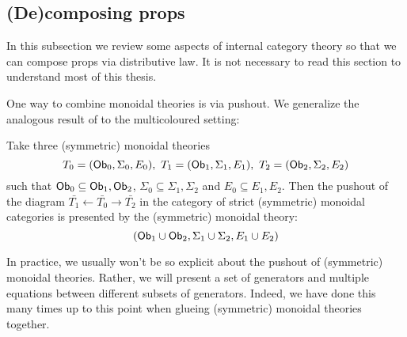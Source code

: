 

\subsection{(De)composing props}
\label{subsec:internal}
%
%
%
%
%
%
%



In this subsection we review some aspects of internal category theory so that we can compose props via distributive law.  It is not necessary to read this section to understand most of this thesis.






One way to combine monoidal theories is via pushout.  We generalize the analogous result of \cite[Proposition 2.51]{ih} to the multicoloured setting:
\begin{lemma}
Take three (symmetric) monoidal theories
$$T_0=({\sf Ob}_0,\Sigma_0 ,E_0 ), \ T_1=({\sf Ob}_1,\Sigma_1 ,E_1 ), \ T_2=({\sf Ob}_2,\Sigma_2 ,E_2 )$$
such that ${\sf Ob}_0 \subseteq {\sf Ob}_1,{\sf Ob}_2$, $\Sigma_0 \subseteq \Sigma_1,\Sigma_2$ and $E_0 \subseteq E_1,E_2$.
Then the pushout of the diagram $\bar{T_1} \leftarrow \bar{T_0} \rightarrow \bar{T_2}$  in the category of strict (symmetric) monoidal categories is presented by the (symmetric) monoidal theory:
$$
( {\sf Ob}_1 \cup {\sf Ob}_2, \Sigma_1 \cup \Sigma_2, E_1 \cup E_2)
$$
\end{lemma}
In practice, we usually won't be so explicit about the pushout of (symmetric) monoidal theories.  Rather, we will present a set of generators and multiple equations between different subsets of generators.  Indeed, we have done this many times up to this point when glueing (symmetric) monoidal theories together.  



